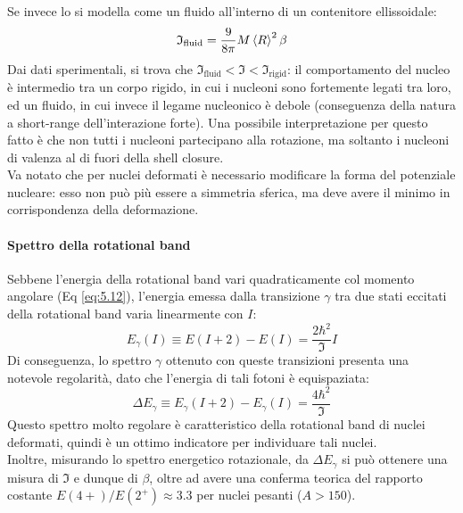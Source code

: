 Se invece lo si modella come un fluido all'interno di un contenitore ellissoidale:
\begin{equation}
	\mathfrak{I}_{\text{fluid}} = \frac{9}{8\pi} M \braket{R}^2 \beta
	\label{eq:5.14}
\end{equation}
Dai dati sperimentali, si trova che $ \mathfrak{I}_{\text{fluid}} < \mathfrak{I} < \mathfrak{I}_{\text{rigid}} $: il comportamento del nucleo è intermedio tra un corpo rigido, in cui i nucleoni sono fortemente legati tra loro, ed un fluido, in cui invece il legame nucleonico è debole (conseguenza della natura a short-range dell'interazione forte). Una possibile interpretazione per questo fatto è che non tutti i nucleoni partecipano alla rotazione, ma soltanto i nucleoni di valenza al di fuori della shell closure.\\
Va notato che per nuclei deformati è necessario modificare la forma del potenziale nucleare: esso non può più essere a simmetria sferica, ma deve avere il minimo in corrispondenza della deformazione.

\paragraph{Spettro della rotational band}

Sebbene l'energia della rotational band vari quadraticamente col momento angolare (Eq \ref{eq:5.12}), l'energia emessa dalla transizione $ \gamma $ tra due stati eccitati della rotational band varia linearmente con $ I $:
\begin{equation}
	E_{\gamma}(I) \equiv E(I + 2) - E(I) = \frac{2\hbar^2}{\mathfrak{I}} I
	\label{eq:5.15}
\end{equation}
Di conseguenza, lo spettro $ \gamma $ ottenuto con queste transizioni presenta una notevole regolarità, dato che l'energia di tali fotoni è equispaziata:
\begin{equation}
	\Delta E_{\gamma} \equiv E_{\gamma}(I + 2) - E_{\gamma}(I) = \frac{4\hbar^2}{\mathfrak{I}}
	\label{eq:5.16}
\end{equation}
Questo spettro molto regolare è caratteristico della rotational band di nuclei deformati, quindi è un ottimo indicatore per individuare tali nuclei.\\
Inoltre, misurando lo spettro energetico rotazionale, da $ \Delta E_{\gamma} $ si può ottenere una misura di $ \mathfrak{I} $ e dunque di $ \beta $, oltre ad avere una conferma teorica del rapporto costante $ E(4+) / E(2^+) \approx 3.3 $ per nuclei pesanti ($ A > 150 $).

